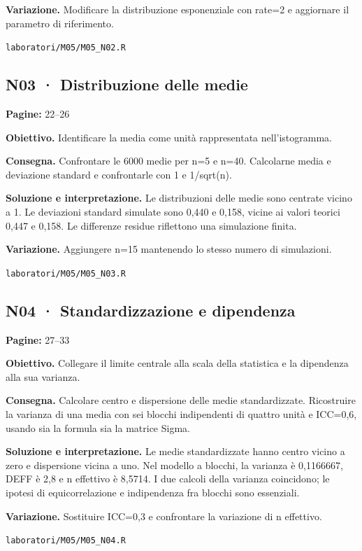 \documentclass[11pt,a4paper]{article}
\begin{document}
\textbf{Variazione.} Modificare la distribuzione esponenziale con rate=2 e aggiornare il parametro di riferimento.

\texttt{laboratori/M05/M05\_N02.R}

\newpage

\subsection*{N03 · Distribuzione delle medie}

\textbf{Pagine:} 22–26

\textbf{Obiettivo.} Identificare la media come unità rappresentata nell’istogramma.

\textbf{Consegna.} Confrontare le 6000 medie per n=5 e n=40. Calcolarne media e deviazione standard e confrontarle con 1 e 1/sqrt(n).

\textbf{Soluzione e interpretazione.} Le distribuzioni delle medie sono centrate vicino a 1. Le deviazioni standard simulate sono 0,440 e 0,158, vicine ai valori teorici 0,447 e 0,158. Le differenze residue riflettono una simulazione finita.

\textbf{Variazione.} Aggiungere n=15 mantenendo lo stesso numero di simulazioni.

\texttt{laboratori/M05/M05\_N03.R}

\subsection*{N04 · Standardizzazione e dipendenza}

\textbf{Pagine:} 27–33

\textbf{Obiettivo.} Collegare il limite centrale alla scala della statistica e la dipendenza alla sua varianza.

\textbf{Consegna.} Calcolare centro e dispersione delle medie standardizzate. Ricostruire la varianza di una media con sei blocchi indipendenti di quattro unità e ICC=0,6, usando sia la formula sia la matrice Sigma.

\textbf{Soluzione e interpretazione.} Le medie standardizzate hanno centro vicino a zero e dispersione vicina a uno. Nel modello a blocchi, la varianza è 0,1166667, DEFF è 2,8 e n effettivo è 8,5714. I due calcoli della varianza coincidono; le ipotesi di equicorrelazione e indipendenza fra blocchi sono essenziali.

\textbf{Variazione.} Sostituire ICC=0,3 e confrontare la variazione di n effettivo.

\texttt{laboratori/M05/M05\_N04.R}
\end{document}
